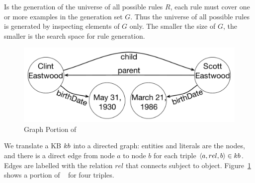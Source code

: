 Is the generation of the universe of all possible rules $R$, 
each rule must cover one or more examples in the generation set $G$. 
Thus the universe of all possible rules is generated by inspecting elements of $G$ only. 
The smaller the size of $G$, the smaller is the search space for rule generation. 


\begin{figure}[t]
	\centering
	\includegraphics[width=0.7\columnwidth]{include/figure/graph_example.pdf}
	\vspace{-2.5ex}
	\caption{Graph Portion of \dbpedia}
	\label{fig:krd_graph_example}
	\vspace{-3ex}
\end{figure}

We translate a KB ${\sc kb}$ into a directed graph: entities and literals are the nodes, and there is a direct edge from node $a$ to node $b$ for each triple $\langle a,rel,b\rangle \in {\sc kb}$. 
Edges are labelled with the relation $rel$ that connects subject to object. Figure~\ref{fig:krd_graph_example} shows a portion of \dbpedia~\cite{bizer2009dbpedia} for four triples.

